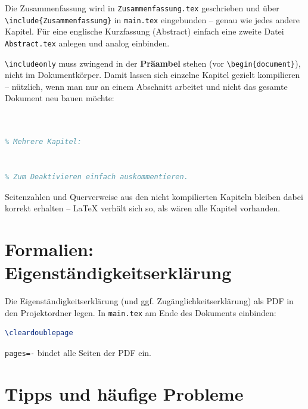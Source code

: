 Die Zusammenfassung wird in \texttt{Zusammenfassung.tex} geschrieben und über
\texttt{\textbackslash include\{Zusammenfassung\}} in \texttt{main.tex} eingebunden --
genau wie jedes andere Kapitel. Für eine englische Kurzfassung (Abstract) einfach
eine zweite Datei \texttt{Abstract.tex} anlegen und analog einbinden.

\texttt{\textbackslash includeonly} muss zwingend in der \textbf{Präambel} stehen
(vor \texttt{\textbackslash begin\{document\}}), nicht im Dokumentkörper.
Damit lassen sich einzelne Kapitel gezielt kompilieren -- nützlich, wenn man nur
an einem Abschnitt arbeitet und nicht das gesamte Dokument neu bauen möchte:

\begin{lstlisting}[language=tex]
% Nur die Einleitung kompilieren:


% Mehrere Kapitel:


% Zum Deaktivieren einfach auskommentieren.
\end{lstlisting}

Seitenzahlen und Querverweise aus den nicht kompilierten Kapiteln bleiben dabei
korrekt erhalten -- LaTeX verhält sich so, als wären alle Kapitel vorhanden.

\section{Formalien: Eigenständigkeitserklärung}
\label{sec:formalien}

Die Eigenständigkeitserklärung (und ggf. Zugänglichkeitserklärung) als PDF in den Projektordner legen.
In \texttt{main.tex} am Ende des Dokuments einbinden:

\begin{lstlisting}[language=tex]
\cleardoublepage

\end{lstlisting}

\texttt{pages=-} bindet alle Seiten der PDF ein.

\section{Tipps und häufige Probleme}
\label{sec:tipps}

